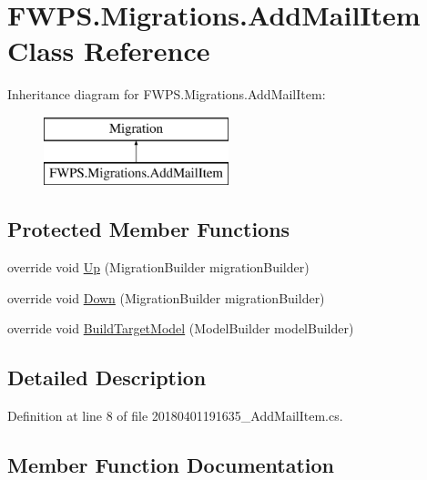 \hypertarget{class_f_w_p_s_1_1_migrations_1_1_add_mail_item}{}\section{F\+W\+P\+S.\+Migrations.\+Add\+Mail\+Item Class Reference}
\label{class_f_w_p_s_1_1_migrations_1_1_add_mail_item}
Inheritance diagram for F\+W\+P\+S.\+Migrations.\+Add\+Mail\+Item\+:\begin{figure}[H]
\begin{center}
\leavevmode
\includegraphics[height=2.000000cm]{class_f_w_p_s_1_1_migrations_1_1_add_mail_item}
\end{center}
\end{figure}
\subsection*{Protected Member Functions}
\begin{DoxyCompactItemize}
\item 
override void \mbox{\hyperlink{class_f_w_p_s_1_1_migrations_1_1_add_mail_item_aebbde7d1fb78bf46bd302eaf91ae1989}{Up}} (Migration\+Builder migration\+Builder)
\item 
override void \mbox{\hyperlink{class_f_w_p_s_1_1_migrations_1_1_add_mail_item_a83b780870d61f33cdfc828573c4808f2}{Down}} (Migration\+Builder migration\+Builder)
\item 
override void \mbox{\hyperlink{class_f_w_p_s_1_1_migrations_1_1_add_mail_item_a38fb6f169b5a06e415542f04b49b6e0f}{Build\+Target\+Model}} (Model\+Builder model\+Builder)
\end{DoxyCompactItemize}


\subsection{Detailed Description}


Definition at line 8 of file 20180401191635\+\_\+\+Add\+Mail\+Item.\+cs.



\subsection{Member Function Documentation}
\mbox{\label{class_f_w_p_s_1_1_migrations_1_1_add_mail_item_a38fb6f169b5a06e415542f04b49b6e0f}} 
